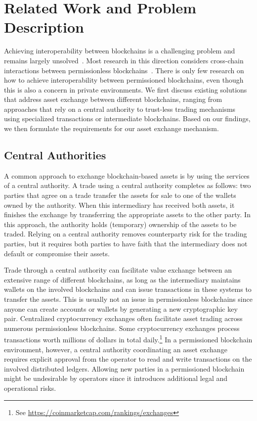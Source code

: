 \section{Related Work and Problem Description}
\label{sec:background_problem_description}
Achieving interoperability between blockchains is a challenging problem and remains largely unsolved~\cite{zamyatin2019sok,vo2018internet,buterin2016chain}.
Most research in this direction considers cross-chain interactions between permissionless blockchains~\cite{koens2019assessing}.
There is only few research on how to achieve interoperability between permissioned blockchains, even though this is also a concern in private environments.
We first discuss existing solutions that address asset exchange between different blockchains, ranging from approaches that rely on a central authority to trust-less trading mechanisms using specialized transactions or intermediate blockchains.
Based on our findings, we then formulate the requirements for our asset exchange mechanism.

\subsection{Central Authorities}
A common approach to exchange blockchain-based assets is by using the services of a central authority.
A trade using a central authority completes as follows: two parties that agree on a trade transfer the assets for sale to one of the wallets owned by the authority.
When this intermediary has received both assets, it finishes the exchange by transferring the appropriate assets to the other party.
In this approach, the authority holds (temporary) ownership of the assets to be traded.
Relying on a central authority removes counterparty risk for the trading parties, but it requires both parties to have faith that the intermediary does not default or compromise their assets.

Trade through a central authority can facilitate value exchange between an extensive range of different blockchains, as long as the intermediary maintains wallets on the involved blockchains and can issue transactions in these systems to transfer the assets.
This is usually not an issue in permissionless blockchains since anyone can create accounts or wallets by generating a new cryptographic key pair.
Centralized cryptocurrency exchanges often facilitate asset trading across numerous permissionless blockchains.
Some cryptocurrency exchanges process transactions worth millions of dollars in total daily.\footnote{See \url{https://coinmarketcap.com/rankings/exchanges}}
In a permissioned blockchain environment, however, a central authority coordinating an asset exchange requires explicit approval from the operator to read and write transactions on the involved distributed ledgers.
Allowing new parties in a permissioned blockchain might be undesirable by operators since it introduces additional legal and operational risks.

